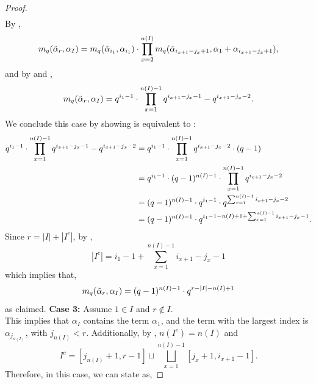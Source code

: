 \documentclass[10pt]{article}
\newcommand{\hr}[0]{\Tilde{\alpha}}
\begin{document}
\begin{proof}
\begin{align}
    \end{align}
    By ,
    \begin{align}
        m_q(\hr_r,\alpha_I) = m_q(\hr_{i_1},\alpha_{i_1})\cdot \prod_{x=2}^{n(I)}m_q(\hr_{i_{x+1}-j_x+1},\alpha_1+\alpha_{i_{x+1}-j_x+1}),\notag
    \end{align}
    and by  and ,
    \begin{align}
        m_q(\hr_r,\alpha_I) = q^{i_1-1}\cdot \prod_{x=1}^{n(I)-1}q^{i_{x+1}-j_x-1}-q^{i_{x+1}-j_x-2}.\label{Case 2 with best lemma used}
    \end{align}
    We conclude this case by showing  is equivalent to :
    \begin{align}
        q^{i_1-1}\cdot \prod_{x=1}^{n(I)-1}q^{i_{x+1}-j_x-1}-q^{i_{x+1}-j_x-2}&=q^{i_1-1}\cdot \prod_{x=1}^{n(I)-1}q^{i_{x+1}-j_x-2}\cdot(q-1) \notag\\
        &= q^{i_1-1}\cdot (q-1)^{n(I)-1}\cdot\prod_{x=1}^{n(I)-1}q^{i_{x+1}-j_x-2}\notag \\
        &= (q-1)^{n(I)-1}\cdot q^{i_1-1}\cdot q^{\sum_{x=1}^{n(I)-1} i_{x+1}-j_x-2}\notag\\
        &=(q-1)^{n(I)-1}\cdot q^{i_1-1-n(I)+1+\sum_{x=1}^{n(I)-1} i_{x+1}-j_x-1}\label{eq: case 2 exp clean up}.
    \end{align}
    Since $r=|I|+|I^c|$, by ,
    \begin{equation}
        |I^c| = i_1-1 + \sum_{x=1}^{n(I)-1} i_{x+1}-j_x-1
    \end{equation}
    which implies that,
    \begin{equation}
        m_q(\hr_r,\alpha_I) = (q-1)^{n(I)-1}\cdot q^{r-|I|-n(I)+1}\notag
    \end{equation}
    as claimed.
    \newline\noindent \textbf{Case 3:} Assume $1\in I$ and $r\notin I$. \\
    This implies that $\alpha_I$ contains the term $\alpha_1$, and the term with the largest index is $\alpha_{j_{n(I)}}$, with $j_{n(I)}<r$. Additionally, by , $n(I^c)=n(I)$ and
    \begin{equation}
        I^c = [j_{n(I)}+1,r-1] \sqcup \bigsqcup_{x=1}^{n(I)-1}[j_x+1,i_{x+1}-1].\label{interval partition for case 3}
    \end{equation}
    Therefore, in this case, we can state  as,

\end{proof}
\end{document}
